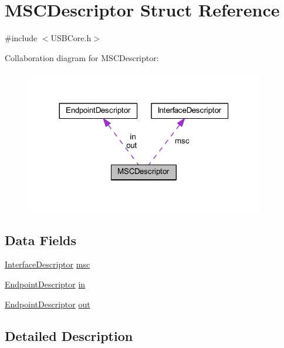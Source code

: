 \hypertarget{struct_m_s_c_descriptor}{}\section{M\+S\+C\+Descriptor Struct Reference}
\label{struct_m_s_c_descriptor}


{\ttfamily \#include $<$U\+S\+B\+Core.\+h$>$}



Collaboration diagram for M\+S\+C\+Descriptor\+:\nopagebreak
\begin{figure}[H]
\begin{center}
\leavevmode
\includegraphics[width=296pt]{struct_m_s_c_descriptor__coll__graph}
\end{center}
\end{figure}
\subsection*{Data Fields}
\begin{DoxyCompactItemize}
\item 
\hyperlink{struct_interface_descriptor}{Interface\+Descriptor} \hyperlink{struct_m_s_c_descriptor_af01c68cfcf5830b0d5ff44c2751c12c0}{msc}
\item 
\hyperlink{struct_endpoint_descriptor}{Endpoint\+Descriptor} \hyperlink{struct_m_s_c_descriptor_a93dcef3b3e3062b904269bcad94771b5}{in}
\item 
\hyperlink{struct_endpoint_descriptor}{Endpoint\+Descriptor} \hyperlink{struct_m_s_c_descriptor_afcf3c947c6e5ace7853bc3e313c0c4aa}{out}
\end{DoxyCompactItemize}


\subsection{Detailed Description}


